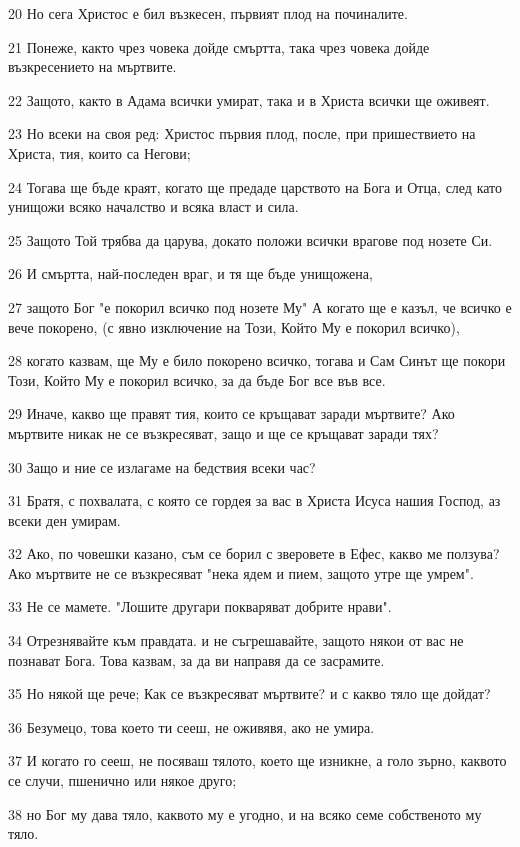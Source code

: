 \par 20 Но сега Христос е бил възкесен, първият плод на починалите.
\par 21 Понеже, както чрез човека дойде смъртта, така чрез човека дойде възкресението на мъртвите.
\par 22 Защото, както в Адама всички умират, така и в Христа всички ще оживеят.
\par 23 Но всеки на своя ред: Христос първия плод, после, при пришествието на Христа, тия, които са Негови;
\par 24 Тогава ще бъде краят, когато ще предаде царството на Бога и Отца, след като унищожи всяко началство и всяка власт и сила.
\par 25 Защото Той трябва да царува, докато положи всички врагове под нозете Си.
\par 26 И смъртта, най-последен враг, и тя ще бъде унищожена,
\par 27 защото Бог "е покорил всичко под нозете Му" А когато ще е казъл, че всичко е вече покорено, (с явно изключение на Този, Който Му е покорил всичко),
\par 28 когато казвам, ще Му е било покорено всичко, тогава и Сам Синът ще покори Този, Който Му е покорил всичко, за да бъде Бог все във все.
\par 29 Иначе, какво ще правят тия, които се кръщават заради мъртвите? Ако мъртвите никак не се възкресяват, защо и ще се кръщават заради тях?
\par 30 Защо и ние се излагаме на бедствия всеки час?
\par 31 Братя, с похвалата, с която се гордея за вас в Христа Исуса нашия Господ, аз всеки ден умирам.
\par 32 Ако, по човешки казано, съм се борил с зверовете в Ефес, какво ме ползува? Ако мъртвите не се възкресяват "нека ядем и пием, защото утре ще умрем".
\par 33 Не се мамете. "Лошите другари покваряват добрите нрави".
\par 34 Отрезнявайте към правдата. и не съгрешавайте, защото някои от вас не познават Бога. Това казвам, за да ви направя да се засрамите.
\par 35 Но някой ще рече; Как се възкресяват мъртвите? и с какво тяло ще дойдат?
\par 36 Безумецо, това което ти сееш, не оживявя, ако не умира.
\par 37 И когато го сееш, не посяваш тялото, което ще изникне, а голо зърно, каквото се случи, пшенично или някое друго;
\par 38 но Бог му дава тяло, каквото му е угодно, и на всяко семе собственото му тяло.
